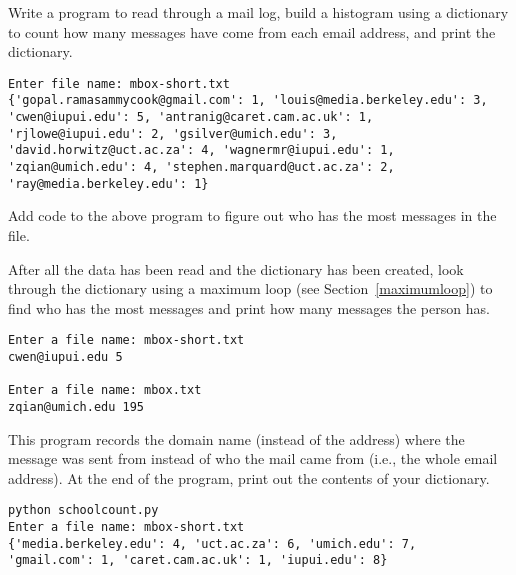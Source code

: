 \begin{ex}
Write a program to read through a mail log,  
build a histogram using a dictionary to count how many 
messages have come from each email address, 
and print the dictionary.

\beforeverb
\begin{verbatim}
Enter file name: mbox-short.txt
{'gopal.ramasammycook@gmail.com': 1, 'louis@media.berkeley.edu': 3, 
'cwen@iupui.edu': 5, 'antranig@caret.cam.ac.uk': 1, 
'rjlowe@iupui.edu': 2, 'gsilver@umich.edu': 3, 
'david.horwitz@uct.ac.za': 4, 'wagnermr@iupui.edu': 1, 
'zqian@umich.edu': 4, 'stephen.marquard@uct.ac.za': 2, 
'ray@media.berkeley.edu': 1}
\end{verbatim}
\afterverb
\end{ex}

\begin{ex}
Add code to the above program to figure out who has the 
most messages in the file.

After all the data has been read and the dictionary has been
created, look through the dictionary using a maximum loop
 (see Section~\ref{maximumloop})
to find who has the most 
messages and print how many messages the person has.

\beforeverb
\begin{verbatim}
Enter a file name: mbox-short.txt
cwen@iupui.edu 5

Enter a file name: mbox.txt
zqian@umich.edu 195
\end{verbatim}
\afterverb
\end{ex}

\begin{ex}
This program records the domain name (instead of the address) 
where the message was sent from instead of who the mail 
came from (i.e., the whole email address). At the end 
of the program, print out the contents of your dictionary. 

\beforeverb
\begin{verbatim}
python schoolcount.py
Enter a file name: mbox-short.txt
{'media.berkeley.edu': 4, 'uct.ac.za': 6, 'umich.edu': 7, 
'gmail.com': 1, 'caret.cam.ac.uk': 1, 'iupui.edu': 8}
\end{verbatim}
\afterverb
\end{ex}

